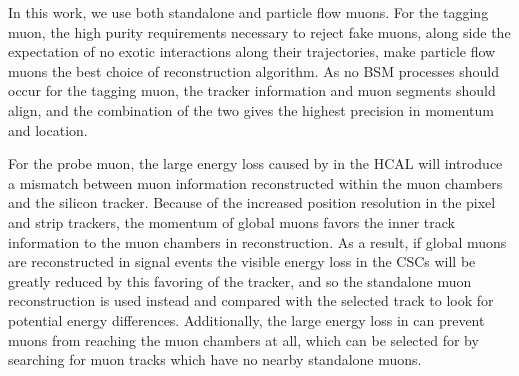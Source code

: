 In this work, we use both standalone and particle flow muons. 
For the tagging muon, the high purity requirements necessary to reject fake muons, along side the expectation of no exotic interactions along their trajectories, make particle flow muons the best choice of reconstruction algorithm. 
As no BSM processes should occur for the tagging muon, the tracker information and muon segments should align, and the combination of the two gives the highest precision in momentum and location. 

For the probe muon, the large energy loss caused by \dbrem in the HCAL will introduce a mismatch between muon information reconstructed within the muon chambers and the silicon tracker. 
Because of the increased position resolution in the pixel and strip trackers, the momentum of global muons favors the inner track information to the muon chambers in reconstruction.
As a result, if global muons are reconstructed in signal events the visible energy loss in the CSCs will be greatly reduced by this favoring of the tracker, and so the standalone muon reconstruction is used instead and compared with the selected track to look for potential energy differences.
Additionally, the large energy loss in \dbrem can prevent muons from reaching the muon chambers at all, which can be selected for by searching for muon tracks which have no nearby standalone muons.
